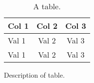 \documentclass[apj]{emulateapj}
\begin{document}
\begin{table}
\begin{center}
\begin{threeparttable}
\caption{A table.}
\begin{tabular}{|l|c|c|}
\hline 
Col 1 & Col 2 & Col 3 \\
 \hline  
Val 1 & Val 2 & Val 3 \\
Val 1 & Val 2 & Val 3 \\
\hline
\end{tabular} 
\vskip 2mm
\begin{tablenotes} \item  
\begin{center}
\begin{flushleft}
Description of table.
\end{flushleft}
\end{center}
\end{tablenotes}
\label{tab:vitalStats_kappa}
\end{threeparttable}
\end{center}
\end{table}




\end{document}
